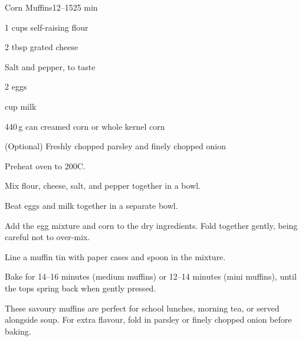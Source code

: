 \begin{recipebox}{Corn Muffins}{12--15}{25 min}
\begin{ingredients}
  \item 1 cups self-raising flour
  \item 2 tbsp grated cheese
  \item Salt and pepper, to taste
  \item 2 eggs
  \item {} cup milk
  \item 440\,g can creamed corn or whole kernel corn
  \item (Optional) Freshly chopped parsley and finely chopped onion
\end{ingredients}

\begin{method}
  \item Preheat oven to 200\degree C.  
  \item Mix flour, cheese, salt, and pepper together in a bowl.  
  \item Beat eggs and milk together in a separate bowl.  
  \item Add the egg mixture and corn to the dry ingredients. Fold together gently, being careful not to over-mix.  
  \item Line a muffin tin with paper cases and spoon in the mixture.  
  \item Bake for 14–16 minutes (medium muffins) or 12–14 minutes (mini muffins), until the tops spring back when gently pressed.  
\end{method}

\begin{notes}
These savoury muffins are perfect for school lunches, morning tea, or served alongside soup.  
For extra flavour, fold in parsley or finely chopped onion before baking.  
\end{notes}
\end{recipebox}
